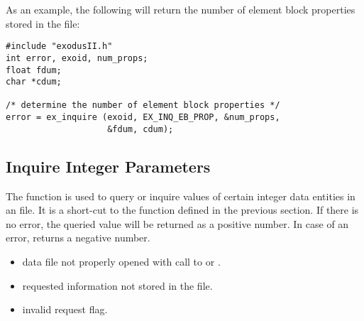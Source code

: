 As an example, the following will return the number of element 
block properties stored in the \exo{} file:

\begin{lstlisting}
#include "exodusII.h"
int error, exoid, num_props;
float fdum;
char *cdum;

/* determine the number of element block properties */
error = ex_inquire (exoid, EX_INQ_EB_PROP, &num_props, 
                    &fdum, cdum);
\end{lstlisting}


\subsection{Inquire \exo{} Integer Parameters}


The function  is used to query or inquire
values of certain integer data entities in an \exo{} file. It is a
short-cut to the  function defined in the previous
section.  If there is no error, the queried value will be returned as
a positive number. In case of an error,  returns a
negative number.

\begin{itemize}
 \item data file not properly opened with call to  or
 .
 \item requested information not stored in the file.
 \item invalid request flag.
\end{itemize}



